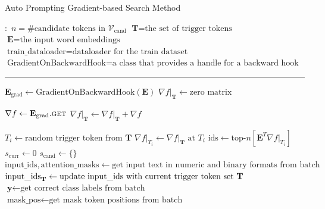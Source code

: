 \begin{algorithm}
\caption{Auto Prompting Gradient-based Search Method} \label{alg:auto-hotflip}
\begin{algorithmic}[1]
\small
\Require $\boldsymbol{:}$ 
\newline $n = \text{\# candidate tokens in $\mathcal{V}_{\text{cand}}$}$ 
\newline $\textbf{T} = \text{the set of trigger tokens}$
\newline $\textbf{E} = \text{the input word embeddings}$
\newline $\text{train\_dataloader} = \text{dataloader for the train dataset}$
\newline $\text{GradientOnBackwardHook} = \text{a class that provides a handle for a backward hook}$
\vspace{0.3em}
\hrule
\vspace{0.3em}

\State $\textbf{E}_\text{grad} \gets \text{GradientOnBackwardHook}(\textbf{E})$
{\color{mylightgrey}}
\State $\nabla f|_{\textbf{T}} \gets \text{zero matrix}$
{\color{mylightgrey}}

\State $\nabla f \gets \textbf{E}_\text{grad}.\Call{\text{get}}{}$
{\color{mylightgrey}}
\State $\nabla f|_{\textbf{T}} \gets \text{$\nabla f|_{\textbf{T}} + \nabla f$}$
{\color{mylightgrey}}
\EndFunction

\State $T_i \gets \text{random trigger token from $\textbf{T}$}$
\State $\nabla f|_{T_i} \gets \text{$\nabla f|_{\textbf{T}}$ at $T_i$}$
{\color{mylightgrey}}
\State $\text{ids} \gets {\text{top-}n} [\mathbf{E}^T \nabla f|_{T_i}]$
{\color{mylightgrey}}
\State $s_{\text{curr}} \gets 0$
{\color{mylightgrey}}
\State $s_{\text{cand}} \gets \{\}$
{\color{mylightgrey}}
    \State $\text{input\_ids}, \text{attention\_masks} \gets \text{get input text in numeric and binary formats from batch}$
    \State $\text{input\_ids}_{\textbf{T}} \gets \text{update input\_ids with current trigger token set \textbf{T}}$
    \State $\textbf{y} \gets \text{get correct class labels from batch}$
    \State $\text{mask\_pos} \gets \text{get mask token positions from batch}$
    

\end{algorithmic}
\end{algorithm}
